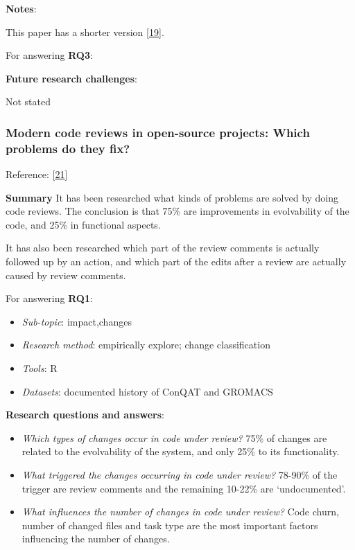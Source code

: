 \documentclass[]{book}
\providecommand{\tightlist}{%
  \setlength{\itemsep}{0pt}\setlength{\parskip}{0pt}}
\begin{document}
\textbf{Notes}:

This paper has a shorter version
{[}\protect\hyperlink{ref-baysal2013influence}{19}{]}.

For answering \textbf{RQ3}:

\textbf{Future research challenges}:

Not stated

\subsubsection{Modern code reviews in open-source projects: Which
problems do they
fix?}\label{modern-code-reviews-in-open-source-projects-which-problems-do-they-fix}

Reference: {[}\protect\hyperlink{ref-beller2014modern}{21}{]}

\textbf{Summary} It has been researched what kinds of problems are
solved by doing code reviews. The conclusion is that 75\% are
improvements in evolvability of the code, and 25\% in functional
aspects.

It has also been researched which part of the review comments is
actually followed up by an action, and which part of the edits after a
review are actually caused by review comments.

For answering \textbf{RQ1}:

\begin{itemize}
\tightlist
\item
  \emph{Sub-topic}: impact,changes
\item
  \emph{Research method}: empirically explore; change classification
\item
  \emph{Tools}: R
\item
  \emph{Datasets}: documented history of ConQAT and GROMACS
\end{itemize}

\textbf{Research questions and answers}:

\begin{itemize}
\tightlist
\item
  \emph{Which types of changes occur in code under review?} 75\% of
  changes are related to the evolvability of the system, and only 25\%
  to its functionality.
\item
  \emph{What triggered the changes occurring in code under review?}
  78-90\% of the trigger are review comments and the remaining 10-22\%
  are `undocumented'.
\item
  \emph{What influences the number of changes in code under review?}
  Code churn, number of changed files and task type are the most
  important factors influencing the number of changes.
\end{itemize}
\end{document}

